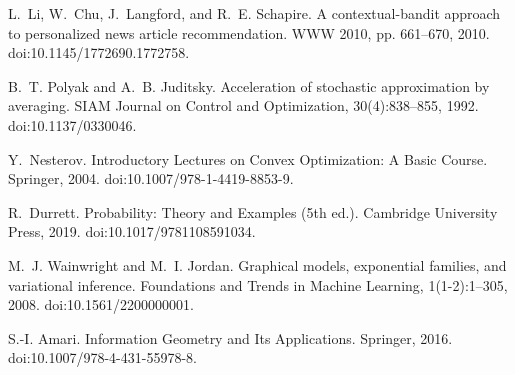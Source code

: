 \begin{thebibliography}{99}
L.~Li, W.~Chu, J.~Langford, and R.~E. Schapire.
A contextual-bandit approach to personalized news article recommendation.
WWW 2010, pp. 661--670, 2010. doi:10.1145/1772690.1772758.

B.~T. Polyak and A.~B. Juditsky.
Acceleration of stochastic approximation by averaging.
SIAM Journal on Control and Optimization, 30(4):838--855, 1992. doi:10.1137/0330046.

Y.~Nesterov.
Introductory Lectures on Convex Optimization: A Basic Course.
Springer, 2004. doi:10.1007/978-1-4419-8853-9.

R.~Durrett.
Probability: Theory and Examples (5th ed.).
Cambridge University Press, 2019. doi:10.1017/9781108591034.

M.~J. Wainwright and M.~I. Jordan.
Graphical models, exponential families, and variational inference.
Foundations and Trends in Machine Learning, 1(1-2):1--305, 2008. doi:10.1561/2200000001.

S.-I. Amari.
Information Geometry and Its Applications.
Springer, 2016. doi:10.1007/978-4-431-55978-8.

\end{thebibliography}
